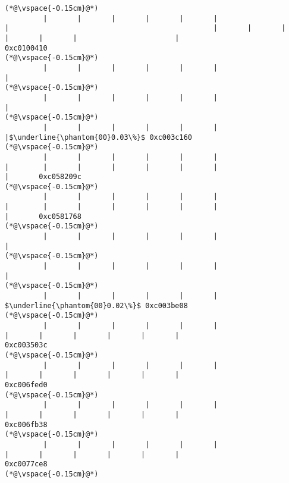 \begin{lstlisting}[caption=NewDirectByteBuffer, label=profile:C2JNewDirectBuffer-512, numberbychapter=true, frame=lines, float, floatplacement=t]
(*@\vspace{-0.15cm}@*)
         |       |       |       |       |       |                       |                                                |       |       |       |       |       |                       |                                               0xc0100410
(*@\vspace{-0.15cm}@*)
         |       |       |       |       |       |                       |
(*@\vspace{-0.15cm}@*)
         |       |       |       |       |       |                       |
(*@\vspace{-0.15cm}@*)
         |       |       |       |       |       |                       |$\underline{\phantom{00}0.03\%}$ 0xc003c160
(*@\vspace{-0.15cm}@*)
         |       |       |       |       |       |                       |        |       |       |       |       |       |                       |       0xc058209c
(*@\vspace{-0.15cm}@*)
         |       |       |       |       |       |                       |        |       |       |       |       |       |                       |       0xc0581768
(*@\vspace{-0.15cm}@*)
         |       |       |       |       |       |                       |
(*@\vspace{-0.15cm}@*)
         |       |       |       |       |       |                       |
(*@\vspace{-0.15cm}@*)
         |       |       |       |       |       |                        $\underline{\phantom{00}0.02\%}$ 0xc003be08
(*@\vspace{-0.15cm}@*)
         |       |       |       |       |       |                                |       |       |       |       |       |                               0xc003503c
(*@\vspace{-0.15cm}@*)
         |       |       |       |       |       |                                |       |       |       |       |       |                               0xc006fed0
(*@\vspace{-0.15cm}@*)
         |       |       |       |       |       |                                |       |       |       |       |       |                               0xc006fb38
(*@\vspace{-0.15cm}@*)
         |       |       |       |       |       |                                |       |       |       |       |       |                               0xc0077ce8
(*@\vspace{-0.15cm}@*)

\end{lstlisting}
